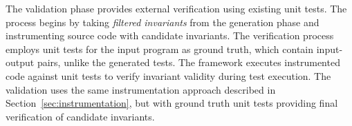 
The validation phase provides external verification using existing unit tests.
The process begins by taking \textit{filtered invariants} from the generation phase and instrumenting source code with candidate invariants.
The verification process employs unit tests for the input program as ground truth, which contain input-output pairs, unlike the generated tests.
The framework executes instrumented code against unit tests to verify invariant validity during test execution.
The validation uses the same instrumentation approach described in Section~\ref{sec:instrumentation}, but with ground truth unit tests providing final verification of candidate invariants.
